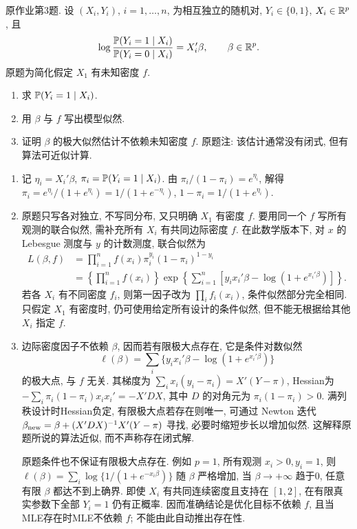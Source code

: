 \begin{exercise}\label{ps08:p03}
原作业第3题. 设 $(X_i,Y_i)$, $i=1,\ldots,n$, 为相互独立的随机对, $Y_i\in\{0,1\}$, $X_i\in\mathbb R^p$, 且
\[
\log\frac{\mathbb P(Y_i=1\mid X_i)}{\mathbb P(Y_i=0\mid X_i)}=X_i'\beta,
\qquad\beta\in\mathbb R^p.
\]
原题为简化假定 $X_1$ 有未知密度 $f$.
\begin{enumerate}[label=\arabic*.]
\item 求 $\mathbb P(Y_i=1\mid X_i)$.
\item 用 $\beta$ 与 $f$ 写出模型似然.
\item 证明 $\beta$ 的极大似然估计不依赖未知密度 $f$. 原题注: 该估计通常没有闭式, 但有算法可近似计算.
\end{enumerate}
\end{exercise}
\begin{solution}
\begin{enumerate}[label=\arabic*.]
\item 记 $\eta_i=X_i'\beta$, $\pi_i=\mathbb P(Y_i=1\mid X_i)$. 由 $\pi_i/(1-\pi_i)=e^{\eta_i}$, 解得
$\pi_i=e^{\eta_i}/(1+e^{\eta_i})=1/(1+e^{-\eta_i})$,
$1-\pi_i=1/(1+e^{\eta_i})$.
\item 原题只写各对独立, 不写同分布, 又只明确 $X_1$ 有密度 $f$. 要用同一个 $f$ 写所有观测的联合似然, 需补充所有 $X_i$ 有共同边际密度 $f$. 在此数学版本下, 对 $x$ 的 Lebesgue 测度与 $y$ 的计数测度, 联合似然为
\begin{align*}
L(\beta,f)&=\prod_{i=1}^nf(x_i)\pi_i^{y_i}(1-\pi_i)^{1-y_i}\\
&=\left\{\prod_{i=1}^nf(x_i)\right\}
\exp\left\{\sum_{i=1}^n[y_ix_i'\beta-\log(1+e^{x_i'\beta})]\right\}.
\end{align*}
若各 $X_i$ 有不同密度 $f_i$, 则第一因子改为 $\prod_if_i(x_i)$, 条件似然部分完全相同. 只假定 $X_1$ 有密度时, 仍可使用给定所有设计的条件似然, 但不能无根据给其他 $X_i$ 指定 $f$.
\item 边际密度因子不依赖 $\beta$, 因而若有限极大点存在, 它是条件对数似然
\[
\ell(\beta)=\sum_i\{y_ix_i'\beta-\log(1+e^{x_i'\beta})\}
\]
的极大点, 与 $f$ 无关. 其梯度为 $\sum_ix_i(y_i-\pi_i)=X'(Y-\pi)$, Hessian为
$-\sum_i\pi_i(1-\pi_i)x_ix_i'=-X'DX$,
其中 $D$ 的对角元为 $\pi_i(1-\pi_i)>0$. 满列秩设计时Hessian负定, 有限极大点若存在则唯一, 可通过 Newton 迭代
$\beta_{\rm new}=\beta+(X'DX)^{-1}X'(Y-\pi)$
寻找, 必要时缩短步长以增加似然. 这解释原题所说的算法近似, 而不声称存在闭式解.

原题条件也不保证有限极大点存在. 例如 $p=1$, 所有观测 $x_i>0,y_i=1$, 则 $\ell(\beta)=\sum_i\log\{1/(1+e^{-x_i\beta})\}$ 随 $\beta$ 严格增加, 当 $\beta\to+\infty$ 趋于0, 任意有限 $\beta$ 都达不到上确界. 即使 $X_i$ 有共同连续密度且支持在 $[1,2]$, 在有限真实参数下全部 $Y_i=1$ 仍有正概率. 因而准确结论是优化目标不依赖 $f$, 且当MLE存在时MLE不依赖 $f$; 不能由此自动推出存在性.
\end{enumerate}
\end{solution}
